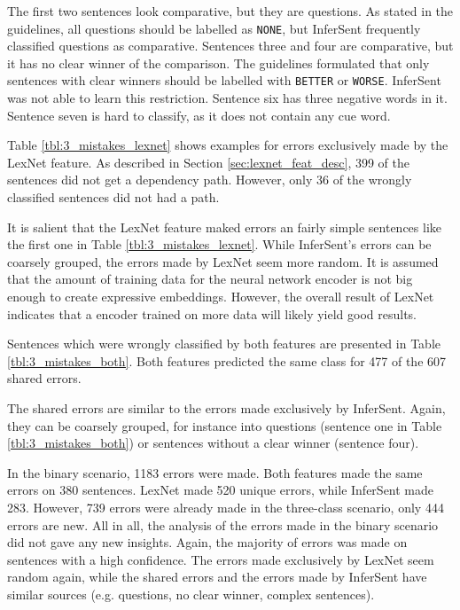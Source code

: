 The first two sentences look comparative, but they are questions. As stated in the guidelines, all questions should be labelled as \texttt{NONE}, but InferSent frequently classified questions as comparative. Sentences three and four are comparative, but it has no clear winner of the comparison. The guidelines formulated that only sentences with clear winners should be labelled with \texttt{BETTER} or \texttt{WORSE}. InferSent was not able to learn this restriction. Sentence six has three negative words in it. Sentence seven is hard to classify, as it does not contain any cue word.

Table \ref{tbl:3_mistakes_lexnet} shows examples for errors exclusively made by the LexNet feature. As described in Section \ref{sec:lexnet_feat_desc}, 399 of the sentences did not get a dependency path. However, only 36 of the wrongly classified sentences did not had a path.

It is salient that the LexNet feature maked errors an fairly simple sentences like the first one in Table \ref{tbl:3_mistakes_lexnet}. While InferSent's errors can be coarsely grouped, the errors made by LexNet seem more random. It is assumed that the amount of training data for the neural network encoder is not big enough to create expressive embeddings. However, the overall result of LexNet indicates that a encoder trained on more data will likely yield good results.

Sentences which were wrongly classified by both features are presented in Table \ref{tbl:3_mistakes_both}. Both features predicted the same class for 477 of the 607 shared errors.

The shared errors are similar to the errors made exclusively by InferSent. Again, they can be coarsely grouped, for instance into questions (sentence one in Table \ref{tbl:3_mistakes_both}) or sentences without a clear winner (sentence four).\newline

In the binary scenario, 1183 errors were made. Both features made the same errors on 380 sentences. LexNet made 520 unique errors, while InferSent made 283. However, 739 errors were already made in the three-class scenario, only 444 errors are new. All in all, the analysis of the errors made in the binary scenario did not gave any new insights. Again, the majority of errors was made on sentences with a high confidence. The errors made exclusively by LexNet seem random again, while the shared errors and the errors made by InferSent have similar sources (e.g. questions, no clear winner, complex sentences). %

